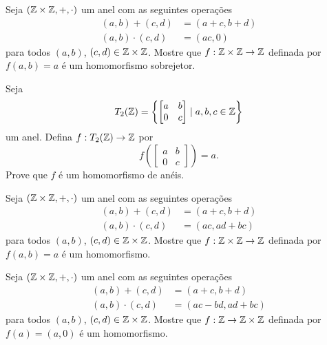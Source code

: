 \documentclass[12pt]{exam}
\begin{document}
    \vspace{.3cm}

    \questao{} Seja $(\mathbb{Z}\times\mathbb{Z}, +, \cdot)$ um anel com as seguintes opera\c{c}\~oes
    \begin{align*}
        (a, b) + (c, d) &= (a + c, b + d)\\
        (a, b)\cdot (c, d) &= (ac, 0)
    \end{align*}
    para todos $(a, b)$, $(c, d) \in \mathbb{Z}\times\mathbb{Z}$.
    Mostre que $ f : \mathbb{Z}\times\mathbb{Z} \to \mathbb{Z}$ definada por $f(a, b) = a$ \'e um homomorfismo sobrejetor.

    \vspace{.3cm}

    \questao{} Seja
    \[
        T_2(\mathbb{Z}) = \left\{\begin{bmatrix}a & b\\ 0 & c\end{bmatrix} \mid a, b, c \in \mathbb{Z}\right\}
    \]
    um anel. Defina $f : T_2(\mathbb{Z}) \to \mathbb{Z}$ por
    \[
        f\left(\begin{bmatrix}a & b\\ 0 & c\end{bmatrix}\right) = a.
    \]
    Prove que $f$ é um homomorfismo de anéis.

    \vspace{.3cm}

    \questao{} Seja $(\mathbb{Z}\times\mathbb{Z}, +, \cdot)$ um anel com as seguintes opera\c{c}\~oes
    \begin{align*}
        (a, b) + (c, d) &= (a + c, b + d)\\
        (a, b)\cdot (c, d) &= (ac, ad + bc)
    \end{align*}
    para todos $(a, b)$, $(c, d) \in \mathbb{Z}\times\mathbb{Z}$.
    Mostre que $ f : \mathbb{Z}\times\mathbb{Z} \to \mathbb{Z}$ definada por $f(a, b) = a$ \'e um homomorfismo.

    \vspace{.3cm}

    \questao{} Seja $(\mathbb{Z}\times\mathbb{Z}, +, \cdot)$ um anel com as seguintes opera\c{c}\~oes
    \begin{align*}
        (a, b) + (c, d) &= (a + c, b + d)\\
        (a, b)\cdot (c, d) &= (ac - bd, ad + bc)
    \end{align*}
    para todos $(a, b)$, $(c, d) \in \mathbb{Z}\times\mathbb{Z}$.
    Mostre que $ f : \mathbb{Z} \to \mathbb{Z}\times\mathbb{Z}$ definada por $f(a) = (a, 0)$ \'e um homomorfismo.

    \vspace{.3cm}
\end{document}

